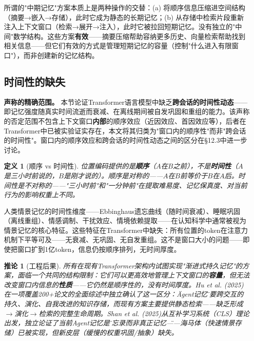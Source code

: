 \documentclass[11pt,a4paper]{ctexart}
\newtheorem{definition}[theorem]{定义}
\newtheorem{corollary}[theorem]{推论}
\begin{document}
所谓的"中期记忆"方案本质上是两种操作的交替：(a) 将顺序信息压缩进空间结构（摘要→嵌入→存储），此时它成为静态的长期记忆；(b) 从存储中检索片段重新注入上下文窗口（检索→展开→注入），此时它被拉回短期记忆。没有独立的"中间"数学结构。这些方案\textbf{有效}——摘要压缩帮助容纳更多历史、向量检索帮助找到相关信息——但它们有效的方式是管理短期记忆的容量（控制"什么进入有限窗口"），而非创建新的记忆结构。

\subsection{时间性的缺失}

\textbf{声称的精确范围。} 本节论证Transformer语言模型中缺乏\textbf{跨会话的时间性动态}——即记忆强度随真实时间流逝而衰减、在离线期间被自发巩固和重组的能力。该声称的否定范围不包含上下文窗口\textbf{内部}的顺序效应（近因效应、首因效应等），后者在Transformer中已被实验证实存在\cite{Mistry2025Episodic,Park2025Temporal}，本文将其归类为"窗口内的顺序性"而非"跨会话的时间性"。窗口内的顺序效应和跨会话的时间性动态之间的区分在§12.3中进一步讨论。

\begin{definition}[顺序 vs 时间性]
    位置编码提供的是\textbf{顺序}（$A$在$B$之前），不是\textbf{时间性}（$A$是三小时前说的，$B$是刚才说的）。顺序是对称的——$A$在$B$前等价于$B$在$A$后。时间性是不对称的——"三小时前"和"一分钟前"在提取难易度、记忆保真度、对当前行为的影响权重上不同。
\end{definition}

人类情景记忆的时间性维度——Ebbinghaus遗忘曲线（随时间衰减）、睡眠巩固（离线重组）、情感调制、干扰效应、情境依赖提取——在认知科学中通常被视为情景记忆的核心特征。这些特征在Transformer中缺失：所有位置的token在注意力机制下平等可及——无衰减、无巩固、无自发重组。这不是窗口大小的问题——即使把窗口扩到1亿token，信息仍按顺序排列，无时间厚度。

\begin{corollary}[工程后果]
    所有在现有Transformer架构内试图实现"渐进式持久记忆"的方案，面临一个共同的结构限制：它们可以更高效地管理上下文窗口的\textbf{容量}，但无法改变窗口内信息的\textbf{性质}——它仍然是顺序性的，没有时间厚度。Hu et al. (2025)\cite{Hu2025AgentMemory}在一项覆盖200+论文的全面综述中独立确认了这一区分：\"Agent记忆\"需要跨交互的持久、演化、自我改进的知识存储，而现有方案主要提供静态检索——缺乏形成$\to$演化$\to$检索的完整生命周期。Shan et al. (2025)\cite{Shan2025Memo}从互补学习系统（CLS）理论出发，独立论证了当前Agent记忆是\"备忘录而非真正记忆\"——海马体（快速情景存储）已被实现，但新皮层（缓慢的权重巩固/抽象）缺失。
\end{corollary}
\end{document}
